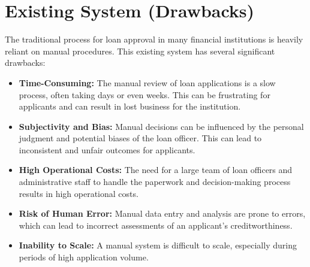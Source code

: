 \documentclass{report}
\begin{document}
\section{Existing System (Drawbacks)}
The traditional process for loan approval in many financial institutions is heavily reliant on manual procedures. This existing system has several significant drawbacks:
\begin{itemize}
    \item \textbf{Time-Consuming:} The manual review of loan applications is a slow process, often taking days or even weeks. This can be frustrating for applicants and can result in lost business for the institution.
    \item \textbf{Subjectivity and Bias:} Manual decisions can be influenced by the personal judgment and potential biases of the loan officer. This can lead to inconsistent and unfair outcomes for applicants.
    \item \textbf{High Operational Costs:} The need for a large team of loan officers and administrative staff to handle the paperwork and decision-making process results in high operational costs.
    \item \textbf{Risk of Human Error:} Manual data entry and analysis are prone to errors, which can lead to incorrect assessments of an applicant's creditworthiness.
    \item \textbf{Inability to Scale:} A manual system is difficult to scale, especially during periods of high application volume.
\end{itemize}
\end{document}
